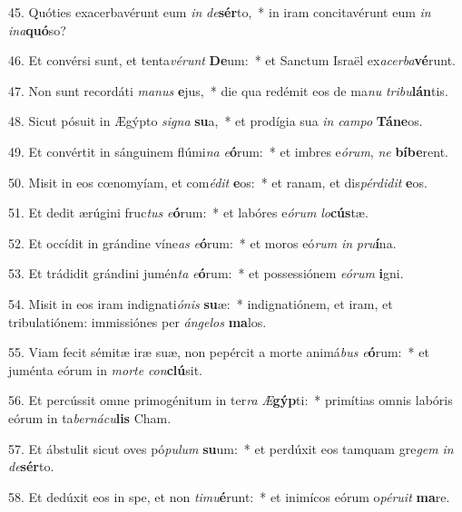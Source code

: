 45. Quóties exacerbavérunt eum \textit{in} \textit{de}\textbf{sér}to,~*  in iram concitavérunt eum \textit{in} \textit{in}\textit{a}\textbf{quó}so?\

46. Et convérsi sunt, et tenta\textit{vé}\textit{runt} \textbf{De}um:~*  et Sanctum Israël ex\textit{a}\textit{cer}\textit{ba}\textbf{vé}runt.\

47. Non sunt recordáti \textit{ma}\textit{nus} \textbf{e}jus,~*  die qua redémit eos de ma\textit{nu} \textit{tri}\textit{bu}\textbf{lán}tis.\

48. Sicut pósuit in Ægýpto \textit{si}\textit{gna} \textbf{su}a,~*  et prodígia sua \textit{in} \textit{cam}\textit{po} \textbf{Tá}\textbf{ne}os.\

49. Et convértit in sánguinem flúmi\textit{na} \textit{e}\textbf{ó}rum:~*  et imbres e\textit{ó}\textit{rum}, \textit{ne} \textbf{bí}\textbf{be}rent.\

50. Misit in eos cœnomyíam, et com\textit{é}\textit{dit} \textbf{e}os:~*  et ranam, et dis\textit{pér}\textit{di}\textit{dit} \textbf{e}os.\

51. Et dedit ærúgini fruc\textit{tus} \textit{e}\textbf{ó}rum:~*  et labóres e\textit{ó}\textit{rum} \textit{lo}\textbf{cús}tæ.\

52. Et occídit in grándine víne\textit{as} \textit{e}\textbf{ó}rum:~*  et moros eó\textit{rum} \textit{in} \textit{pru}\textbf{í}na.\

53. Et trádidit grándini jumén\textit{ta} \textit{e}\textbf{ó}rum:~*  et possessiónem \textit{e}\textit{ó}\textit{rum} \textbf{i}gni.\

54. Misit in eos iram indignati\textit{ó}\textit{nis} \textbf{su}æ:~*  indignatiónem, et iram, et tribulatiónem: immissiónes per \textit{án}\textit{ge}\textit{los} \textbf{ma}los.\

55. Viam fecit sémitæ iræ suæ, non pepércit a morte animá\textit{bus} \textit{e}\textbf{ó}rum:~*  et juménta eórum in \textit{mor}\textit{te} \textit{con}\textbf{clú}sit.\

56. Et percússit omne primogénitum in ter\textit{ra} \textit{Æ}\textbf{gýp}ti:~*  primítias omnis labóris eórum in ta\textit{ber}\textit{ná}\textit{cu}\textbf{lis} Cham.\

57. Et ábstulit sicut oves pó\textit{pu}\textit{lum} \textbf{su}um:~*  et perdúxit eos tamquam gre\textit{gem} \textit{in} \textit{de}\textbf{sér}to.\

58. Et dedúxit eos in spe, et non \textit{ti}\textit{mu}\textbf{é}runt:~*  et inimícos eórum o\textit{pé}\textit{ru}\textit{it} \textbf{ma}re.\

